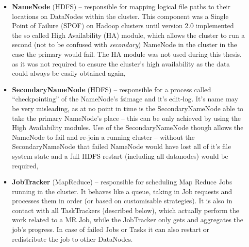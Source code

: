 \begin{itemize}
  \item \textbf{NameNode} (HDFS) -- responsible for mapping logical file paths to their locations on DataNodes within 
                                    the cluster. This component was a Single Point of Failure (SPOF) on Hadoop clusters 
                                    until version 2.0 implemented the so called High Availability (HA) module, which 
                                    allows the cluster to run a second (not to be confused with \textit{secondary}) 
                                    NameNode in the cluster in the case the primary would fail. The HA module was not 
                                    used during this thesis, as it was not required to ensure the cluster's high 
                                    availability as the data could always be easily obtained again,
  \item \textbf{SecondaryNameNode} (HDFS) -- responsible for a process called ``checkpointing'' of the NameNode's
                                            fsimage and it's edit-log. It's name may be very misleading, as at no point
                                            in time is the SecondaryNameNode able to take the primary NameNode's place -- 
                                            this can be only achieved by using the High Availability modules. Use of the 
                                            SecondaryNameNode though allows the NameNode to fail and re-join a running 
                                            cluster -- without the SecondaryNameNode that failed NameNode would have lost 
                                            all of it's file system state and a full HDFS restart (including all 
                                            datanodes) would be required,
  \item \textbf{JobTracker} (MapReduce) -- responsible for scheduling Map Reduce Jobs running in the cluster. It
                                           behaves like a queue, taking in Job requests and processes them in order (or    
                                           based on customisable strategies). It is also in contact with all TaskTrackers 
                                           (described below), which actually perform the work related to a MR Job, while 
                                           the JobTracker only gets and aggregates the job's progress. In case of failed 
                                           Jobs or Tasks it can also restart or redistribute the job to other DataNodes.
\end{itemize}

